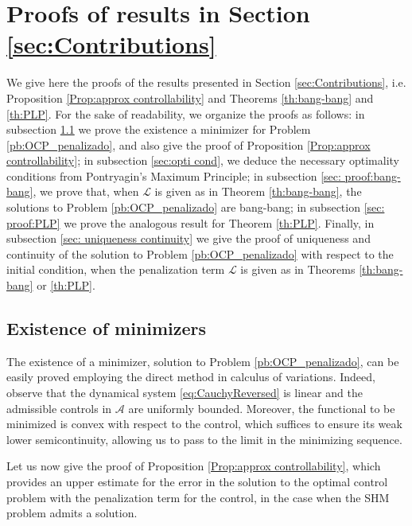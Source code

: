 \documentclass[twocolumn]{autart}    %
\begin{document}
\section{Proofs of results in Section \ref{sec:Contributions}}\label{sec:Proof}

We give here the proofs of the results presented in Section \ref{sec:Contributions}, i.e. Proposition \ref{Prop:approx controllability} and Theorems \ref{th:bang-bang} and \ref{th:PLP}. For the sake of readability, we organize the proofs as follows: in subsection \ref{sec: exist mini} we prove the existence a minimizer for Problem \ref{pb:OCP_penalizado}, and also give the proof of Proposition \ref{Prop:approx controllability}; in subsection \ref{sec:opti cond}, we deduce the necessary optimality conditions from Pontryagin's Maximum Principle; in subsection \ref{sec: proof:bang-bang}, we prove that, when $\mathcal{L}$ is given as in Theorem \ref{th:bang-bang}, the solutions to Problem \ref{pb:OCP_penalizado} are bang-bang; in subsection \ref{sec: proof:PLP} we prove the analogous result for Theorem \ref{th:PLP}. Finally, in subsection \ref{sec: uniqueness continuity} we give the proof of uniqueness and continuity of the solution to Problem \ref{pb:OCP_penalizado} with respect to the initial condition, when the penalization term $\mathcal{L}$ is given as in Theorems \ref{th:bang-bang} or \ref{th:PLP}.

\subsection{Existence of minimizers}\label{sec: exist mini}

The existence of a minimizer, solution to Problem \ref{pb:OCP_penalizado}, can be easily proved employing the direct method in calculus of variations. Indeed, observe that the dynamical system \eqref{eq:CauchyReversed} is linear and the admissible controls in $\mathcal{A}$ are uniformly bounded. Moreover, the functional to be minimized is convex with respect to the control, which suffices to ensure its weak lower semicontinuity, allowing us to pass to the limit in the minimizing sequence.

Let us now give the proof of Proposition \ref{Prop:approx controllability}, which provides an upper estimate for the error in the solution to the optimal control problem with the penalization term for the control, in the case when the SHM problem admits a solution. 
\end{document}
